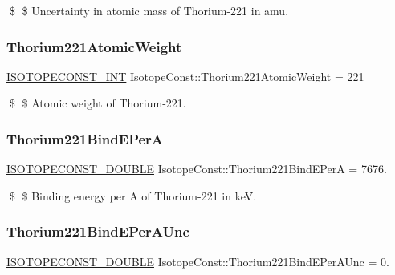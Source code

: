 \$ \$ Uncertainty in atomic mass of Thorium-\/221 in amu. \mbox{\label{group___isotope_const-_thorium-_th221_gaaa384b776670aa3d7b4084a3afe44df9}} 
\subsubsection{\texorpdfstring{Thorium221\+Atomic\+Weight}{Thorium221AtomicWeight}}
{\footnotesize\ttfamily \mbox{\hyperlink{group___isotope_const-_macros_ga5f18360b3e99483a35c32d789e62621c}{I\+S\+O\+T\+O\+P\+E\+C\+O\+N\+S\+T\+\_\+\+I\+NT}} Isotope\+Const\+::\+Thorium221\+Atomic\+Weight = 221}

\$ \$ Atomic weight of Thorium-\/221. \mbox{\label{group___isotope_const-_thorium-_th221_gaa716a011dfdd7685ee943f96cb94aeed}} 
\subsubsection{\texorpdfstring{Thorium221\+Bind\+E\+PerA}{Thorium221BindEPerA}}
{\footnotesize\ttfamily \mbox{\hyperlink{group___isotope_const-_macros_ga8f45a7272ce02c0b4c65c44636ed719a}{I\+S\+O\+T\+O\+P\+E\+C\+O\+N\+S\+T\+\_\+\+D\+O\+U\+B\+LE}} Isotope\+Const\+::\+Thorium221\+Bind\+E\+PerA = 7676.}

\$ \$ Binding energy per A of Thorium-\/221 in keV. \mbox{\label{group___isotope_const-_thorium-_th221_ga750e7b940b042b3b4da674a7c6b7bf1c}} 
\subsubsection{\texorpdfstring{Thorium221\+Bind\+E\+Per\+A\+Unc}{Thorium221BindEPerAUnc}}
{\footnotesize\ttfamily \mbox{\hyperlink{group___isotope_const-_macros_ga8f45a7272ce02c0b4c65c44636ed719a}{I\+S\+O\+T\+O\+P\+E\+C\+O\+N\+S\+T\+\_\+\+D\+O\+U\+B\+LE}} Isotope\+Const\+::\+Thorium221\+Bind\+E\+Per\+A\+Unc = 0.}

